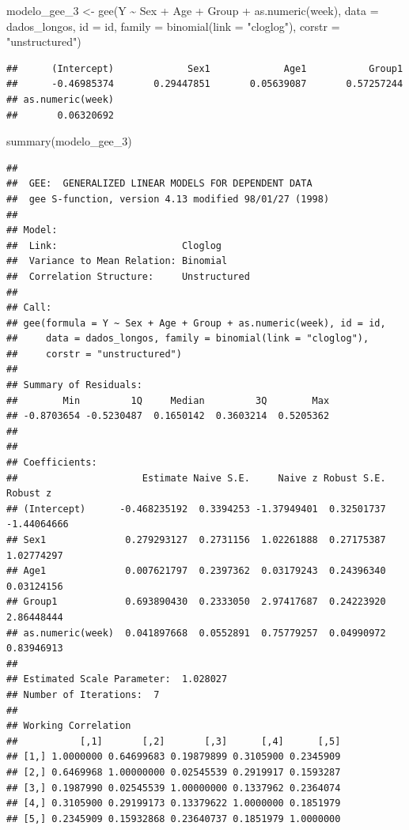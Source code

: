 \documentclass[
]{article}
\newenvironment{Shaded}{\begin{snugshade}}{\end{snugshade}}
\newcommand{\AttributeTok}[1]{\textcolor[rgb]{0.77,0.63,0.00}{#1}}
\newcommand{\FunctionTok}[1]{\textcolor[rgb]{0.00,0.00,0.00}{#1}}
\newcommand{\NormalTok}[1]{#1}
\newcommand{\OtherTok}[1]{\textcolor[rgb]{0.56,0.35,0.01}{#1}}
\newcommand{\SpecialCharTok}[1]{\textcolor[rgb]{0.00,0.00,0.00}{#1}}
\newcommand{\StringTok}[1]{\textcolor[rgb]{0.31,0.60,0.02}{#1}}
\begin{document}
\begin{Shaded}
\begin{Highlighting}[]
\NormalTok{modelo\_gee\_3 }\OtherTok{\textless{}{-}} \FunctionTok{gee}\NormalTok{(Y }\SpecialCharTok{\textasciitilde{}}\NormalTok{ Sex }\SpecialCharTok{+}\NormalTok{ Age }\SpecialCharTok{+}\NormalTok{ Group }\SpecialCharTok{+} \FunctionTok{as.numeric}\NormalTok{(week), }
               \AttributeTok{data =}\NormalTok{ dados\_longos, }
               \AttributeTok{id =}\NormalTok{ id, }
               \AttributeTok{family =} \FunctionTok{binomial}\NormalTok{(}\AttributeTok{link =} \StringTok{"cloglog"}\NormalTok{),}
               \AttributeTok{corstr =} \StringTok{"unstructured"}\NormalTok{)}
\end{Highlighting}
\end{Shaded}

\begin{verbatim}
##      (Intercept)             Sex1             Age1           Group1 
##      -0.46985374       0.29447851       0.05639087       0.57257244 
## as.numeric(week) 
##       0.06320692
\end{verbatim}

\begin{Shaded}
\begin{Highlighting}[]
\FunctionTok{summary}\NormalTok{(modelo\_gee\_3)}
\end{Highlighting}
\end{Shaded}

\begin{verbatim}
## 
##  GEE:  GENERALIZED LINEAR MODELS FOR DEPENDENT DATA
##  gee S-function, version 4.13 modified 98/01/27 (1998) 
## 
## Model:
##  Link:                      Cloglog 
##  Variance to Mean Relation: Binomial 
##  Correlation Structure:     Unstructured 
## 
## Call:
## gee(formula = Y ~ Sex + Age + Group + as.numeric(week), id = id, 
##     data = dados_longos, family = binomial(link = "cloglog"), 
##     corstr = "unstructured")
## 
## Summary of Residuals:
##        Min         1Q     Median         3Q        Max 
## -0.8703654 -0.5230487  0.1650142  0.3603214  0.5205362 
## 
## 
## Coefficients:
##                      Estimate Naive S.E.     Naive z Robust S.E.    Robust z
## (Intercept)      -0.468235192  0.3394253 -1.37949401  0.32501737 -1.44064666
## Sex1              0.279293127  0.2731156  1.02261888  0.27175387  1.02774297
## Age1              0.007621797  0.2397362  0.03179243  0.24396340  0.03124156
## Group1            0.693890430  0.2333050  2.97417687  0.24223920  2.86448444
## as.numeric(week)  0.041897668  0.0552891  0.75779257  0.04990972  0.83946913
## 
## Estimated Scale Parameter:  1.028027
## Number of Iterations:  7
## 
## Working Correlation
##           [,1]       [,2]       [,3]      [,4]      [,5]
## [1,] 1.0000000 0.64699683 0.19879899 0.3105900 0.2345909
## [2,] 0.6469968 1.00000000 0.02545539 0.2919917 0.1593287
## [3,] 0.1987990 0.02545539 1.00000000 0.1337962 0.2364074
## [4,] 0.3105900 0.29199173 0.13379622 1.0000000 0.1851979
## [5,] 0.2345909 0.15932868 0.23640737 0.1851979 1.0000000
\end{verbatim}
\end{document}
